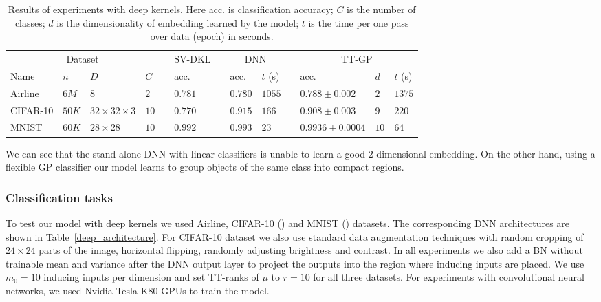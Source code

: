   \begin{table}[t]
    \caption{Results of experiments with deep kernels. Here acc. is classification
            accuracy; $C$ is the number of classes; $d$ is the dimensionality
            of embedding learned by the model; $t$ is the time per one pass over
            data (epoch) in seconds.}
    \label{deep_results}
    \centering
    \begin{tabular}{llll ll llll lll}
      \toprule
      \multicolumn{4}{c}{Dataset}  && SV-DKL &&
      \multicolumn{2}{c}{DNN} &&
      \multicolumn{3}{c}{TT-GP}\\

      \cmidrule{1-4}
      \cmidrule{6-6}
      \cmidrule{8-9}
      \cmidrule{11-13}

      Name & $n$ & $D$ & $C$ &&
      acc. && acc. & $t$ (s) &&
      acc. & $d$ & $t$ (s)
      \\
      \midrule



      Airline & $6M$ & $8$ & $2$ &&
      $0.781$ && $0.780$ & $1055$ &&
      $0.788 \pm 0.002$ & $2$ & $1375$\\

      CIFAR-10 & $50K$ & $32{\times}32{\times}3$ & $10$ &&
      $0.770$ && $0.915$ & $166$ &&
      $0.908 \pm 0.003$ & $9$ & $220$\\

      MNIST & $60K$ & $28{\times}28$ & $10$ &&
      $0.992$ && $0.993$ & $23$ &&
      $0.9936 \pm 0.0004$ & $10$ & $64$\\
      \bottomrule
    \end{tabular}
  \end{table}

  We can see that the stand-alone DNN with linear classifiers is unable
  to learn a good $2$-dimensional embedding.
  On the other hand, using a flexible GP classifier our
  model learns to group objects of the same class into compact regions.

  \subsubsection{Classification tasks}
  To test our model with deep kernels we used Airline,
  CIFAR-10 (\citet{krizhevsky2009}) and
  MNIST (\citet{lecun1998}) datasets. The corresponding DNN architectures are shown
  in Table~\ref{deep_architecture}. For CIFAR-10 dataset we also use standard 
  data augmentation techniques with random cropping of $24 \times 24$
  parts of the image, horizontal flipping, randomly adjusting brightness and contrast. In all experiments we also add a BN without trainable mean and
  variance after the DNN output layer to project the outputs into the region
  where inducing inputs are placed. We use $m_0 = 10$ inducing inputs
  per dimension and set TT-ranks of $\mu$ to $r = 10$ for all three datasets. For experiments with convolutional neural networks, we
  used Nvidia Tesla K80 GPUs to train the model.

